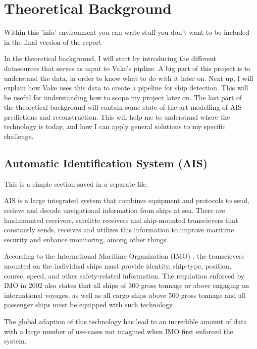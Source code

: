 \chapter{Theoretical Background}
\label{chp:theory}
\begin{info}
	Within this 'info' environment you can write stuff you don't want to be included in the final version of the report
\end{info}

In the theoretical background, I will start by introducing the different datasources that serves as input to Vake's pipline. A big part of this project is to understand the data, in order to know what to do with it later on.
Next up, I will explain how Vake uses this data to create a pipeline for ship detection. This will be useful for understanding how to scope my project later on. 
The last part of the theoretical background will contain some state-of-the-art modelling of AIS-predictions and reconstruction. This will help me to understand where the technology is today, and how I can apply general solutions to my specific challenge. 
\section{Automatic Identification System (AIS)}
\begin{info}{}
	This is a simple section saved in a separate file.
\end{info}
AIS is a large integrated system that combines equipment and protocols to send, recieve and decode navigational information from ships at sea. There are landmounted receivers, satelitte receivers and ship-mounted transcievers that constantly sends, receives and utilizes this information to improve maritime security and enhance monitoring, among other things.

According to the International Maritime Organization (IMO) \cite{MarineSafteyComittee}, the transcievers mounted on the individual ships must provide identity, ship-type, position, course, speed, and other safety-related information. 
The requlation enforced by IMO in 2002 also states that all ships of 300 gross tonnage or above engaging on international voyages, as well as all cargo ships above 500 gross tonnage and all passenger ships must be equipped with such technology. 

The global adaption of this technology has lead to an incredible amount of data with a large number of use-cases not imagined when IMO first enforced the system.  

